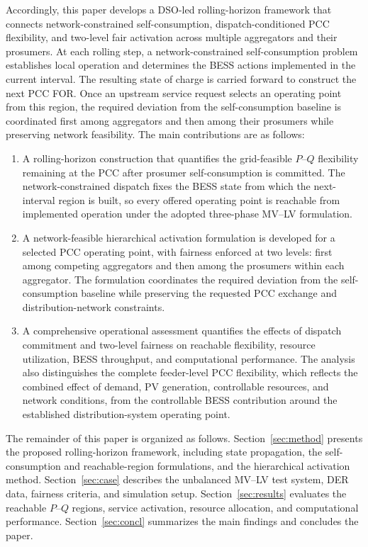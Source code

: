 \documentclass[journal]{IEEEtran}
\begin{document}
Accordingly, this paper develops a DSO-led rolling-horizon framework that connects network-constrained self-consumption, dispatch-conditioned PCC flexibility, and two-level fair activation across multiple aggregators and their prosumers. At each rolling step, a network-constrained self-consumption problem establishes local operation and determines the BESS actions implemented in the current interval. The resulting state of charge is carried forward to construct the next PCC FOR. Once an upstream service request selects an operating point from this region, the required deviation from the self-consumption baseline is coordinated first among aggregators and then among their prosumers while preserving network feasibility. The main contributions are as follows:

\begin{enumerate}
\item A rolling-horizon construction that quantifies the grid-feasible $P$--$Q$ flexibility remaining at the PCC after prosumer self-consumption is committed. The network-constrained dispatch fixes the BESS state from which the next-interval region is built, so every offered operating point is reachable from implemented operation under the adopted three-phase MV--LV formulation.

\item A network-feasible hierarchical activation formulation is developed for a selected PCC operating point, with fairness enforced at two levels: first among competing aggregators and then among the prosumers within each aggregator. The formulation coordinates the required deviation from the self-consumption baseline while preserving the requested PCC exchange and distribution-network constraints.

\item A comprehensive operational assessment quantifies the effects of dispatch commitment and two-level fairness on reachable flexibility, resource utilization, BESS throughput, and computational performance. The analysis also distinguishes the complete feeder-level PCC flexibility, which reflects the combined effect of demand, PV generation, controllable resources, and network conditions, from the controllable BESS contribution around the established distribution-system operating point.

\end{enumerate}

The remainder of this paper is organized as follows. Section~\ref{sec:method} presents the proposed rolling-horizon framework, including state propagation, the self-consumption and reachable-region formulations, and the hierarchical activation method. Section~\ref{sec:case} describes the unbalanced MV--LV test system, DER data, fairness criteria, and simulation setup. Section~\ref{sec:results} evaluates the reachable $P$--$Q$ regions, service activation, resource allocation, and computational performance. Section~\ref{sec:concl} summarizes the main findings and concludes the paper.
\end{document}
